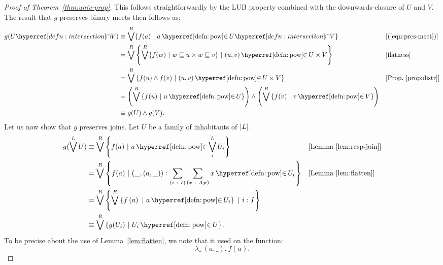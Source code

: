 \begin{proof}[Proof of Theorem~\ref{thm:univ-prop}]
  This follows straightforwardly by the LUB property combined with the downwards-closure
  of $U$ and $V$. The result that $g$ preserves binary meets then follows as:
  \begin{align*}
    g(\intersect{U}{V}) &\equiv \bigvee^R \{ f(a) ~|~ a \mempownm \intersect{U}{V} \}
               && [\text{(\ref{eqn:pres-meet})}] \\
             &= \bigvee^R \setof{ \bigvee^R \{ f(w) ~|~ w \sqsubseteq u \times w \sqsubseteq v \} ~|~ (u, v) \mempownm U \times V }
               && [\text{flatness}]                                                 \\
             &= \bigvee^R \setof{ f(u) \wedge f(v) ~|~ (u, v) \mempownm U \times V }
               &&\text{[Prop.~\ref{prop:distr}]}                                    \\
             &= \left( \bigvee^R \setof{ f(u) ~|~ u \mempownm U } \right)
              \wedge \left( \bigvee^R \setof{ f(v) ~|~ v \mempownm V } \right)                 \\
             &\equiv g(U) \wedge g(V)                                                         .
  \end{align*}
  Let us now show that $g$ preserves joins. Let $U$ be a family of inhabitants of
  $\left| L \right|$.
  \begin{align*}
    g(\bigvee^L U) &\equiv \bigvee^R \setof{ f(a) ~|~ a \mempownm \bigvee^L_i U_i }
                && [\text{Lemma~\ref{lem:resp-join}}]\\
    &= \bigvee^R \setof{ f(a) ~|~ \oftyI{(\_, (a, \_))}{\sigmaty{i}{I}{\sigmaty{x}{A_{\McF{}}}{x \mempownm U_i}}} }
                && [\text{Lemma~\ref{lem:flatten}}] \\
             &= \bigvee^R \setof{ \bigvee^R \img{f}{U_i} ~|~ \oftyI{i}{I} } \\
             &\equiv \bigvee^R \setof{ g(U_i) ~|~ U_i \mempownm U }.
  \end{align*}
  To be precise about the use of Lemma~\ref{lem:flatten}, we note that it used on the
  function:
  \begin{equation*}
    \lambda\_~(a, \_).~f(a).
  \end{equation*}


\end{proof}
